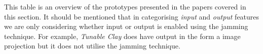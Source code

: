 \begin{landscape}
  \begin{flushleft}
  This table is an overview of the prototypes presented in the papers covered in this section. It should be mentioned that in categorising \textit{input} and \textit{output} features we are only considering whether input or output is enabled using the jamming technique. For example, \textit{Tunable Clay} does have output in the form a image projection but it does not utilise the jamming technique.
  \end{flushleft}

\end{landscape}

